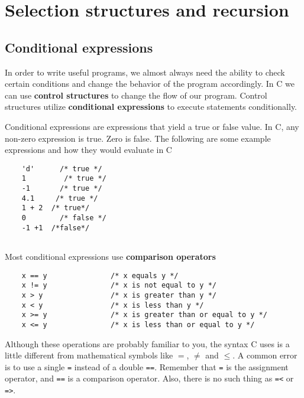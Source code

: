 
\chapter{Selection structures and recursion}

\label{condrecursion}


\section{Conditional expressions}

In order to write useful programs, we almost always need the ability
to check certain conditions and change the behavior of the program
accordingly.  In C we can use {\bf control structures} to change the flow of our program.
Control structures utilize {\bf conditional expressions} to execute statements conditionally.


Conditional expressions are expressions that yield a true or false value. 
In C, any non-zero expression is true. Zero is false. The following are some example expressions and how they would evaluate in C

\begin{verbatim}
	'd'      /* true */
	1         /* true */
	-1       /* true */
	4.1     /* true */
	1 + 2  /* true*/
	0        /* false */
	-1 +1  /*false*/
	
\end{verbatim}
%

Most conditional expressions use {\bf comparison operators} 

\begin{verbatim}
	x == y               /* x equals y */
	x != y               /* x is not equal to y */
	x > y                /* x is greater than y */
	x < y                /* x is less than y */
	x >= y               /* x is greater than or equal to y */
	x <= y               /* x is less than or equal to y */
\end{verbatim}
%
Although these operations are probably familiar to you, the
syntax C uses is a little different from mathematical
symbols like $=$, $\neq$ and $\le$.  A common error is
to use a single {\tt =} instead of a double {\tt ==}.  Remember
that {\tt =} is the assignment operator, and {\tt ==} is
a comparison operator.  Also, there is no such thing as
{\tt =<} or {\tt =>}.

